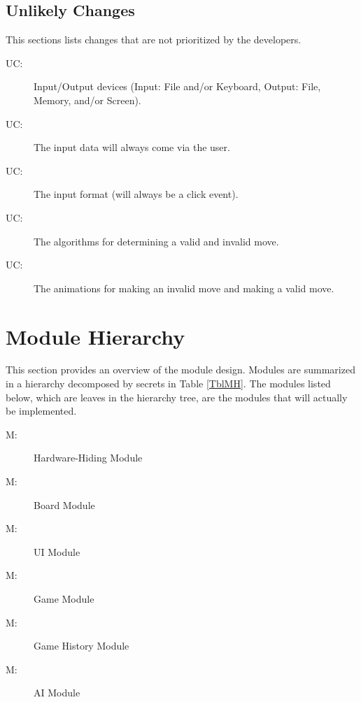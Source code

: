 \documentclass[12pt, titlepage]{article}
\newcounter{ucnum}
\newcommand{\uctheucnum}{UC\theucnum}
\newcounter{mnum}
\newcommand{\mthemnum}{M\themnum}
\begin{document}
{\subsection{Unlikely Changes} \label{SecUchange}

This sections lists changes that are not prioritized by the developers.

\begin{description}
\item[ \uctheucnum \label{ucIO}:] Input/Output devices
  (Input: File and/or Keyboard, Output: File, Memory, and/or Screen).
\item[ \uctheucnum \label{ucInput}:] The input data will always come via the user.
\item[ \uctheucnum \label{ucInput}:] The input format (will always be a click event).
\item[ \uctheucnum \label{ucInput}:] The algorithms for determining a valid and invalid move.
\item[ \uctheucnum \label{ucInput}:] The animations for making an invalid move and making a valid move.
\end{description}

\section{Module Hierarchy} \label{SecMH}

This section provides an overview of the module design. Modules are summarized
in a hierarchy decomposed by secrets in Table \ref{TblMH}. The modules listed
below, which are leaves in the hierarchy tree, are the modules that will
actually be implemented.

\begin{description}
\item [ \mthemnum \label{mHH}:] Hardware-Hiding Module
\item [ \mthemnum \label{mUI}:] Board Module
\item [ \mthemnum \label{mVM}:] UI Module
\item [ \mthemnum \label{mGM}:] Game Module
\item [ \mthemnum \label{mGHM}:] Game History Module
\item [ \mthemnum \label{mAM}:] AI Module
\end{description}


}
\end{document}
